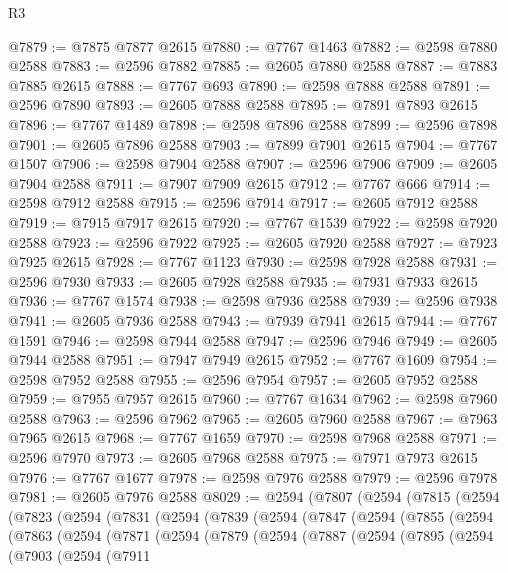 \begin{lexlean}{R3}
\begin{coremodule}
@7879 := @7875 @7877 @2615
@7880 := @7767 @1463
@7882 := @2598 @7880 @2588
@7883 := @2596 @7882
@7885 := @2605 @7880 @2588
@7887 := @7883 @7885 @2615
@7888 := @7767 @693
@7890 := @2598 @7888 @2588
@7891 := @2596 @7890
@7893 := @2605 @7888 @2588
@7895 := @7891 @7893 @2615
@7896 := @7767 @1489
@7898 := @2598 @7896 @2588
@7899 := @2596 @7898
@7901 := @2605 @7896 @2588
@7903 := @7899 @7901 @2615
@7904 := @7767 @1507
@7906 := @2598 @7904 @2588
@7907 := @2596 @7906
@7909 := @2605 @7904 @2588
@7911 := @7907 @7909 @2615
@7912 := @7767 @666
@7914 := @2598 @7912 @2588
@7915 := @2596 @7914
@7917 := @2605 @7912 @2588
@7919 := @7915 @7917 @2615
@7920 := @7767 @1539
@7922 := @2598 @7920 @2588
@7923 := @2596 @7922
@7925 := @2605 @7920 @2588
@7927 := @7923 @7925 @2615
@7928 := @7767 @1123
@7930 := @2598 @7928 @2588
@7931 := @2596 @7930
@7933 := @2605 @7928 @2588
@7935 := @7931 @7933 @2615
@7936 := @7767 @1574
@7938 := @2598 @7936 @2588
@7939 := @2596 @7938
@7941 := @2605 @7936 @2588
@7943 := @7939 @7941 @2615
@7944 := @7767 @1591
@7946 := @2598 @7944 @2588
@7947 := @2596 @7946
@7949 := @2605 @7944 @2588
@7951 := @7947 @7949 @2615
@7952 := @7767 @1609
@7954 := @2598 @7952 @2588
@7955 := @2596 @7954
@7957 := @2605 @7952 @2588
@7959 := @7955 @7957 @2615
@7960 := @7767 @1634
@7962 := @2598 @7960 @2588
@7963 := @2596 @7962
@7965 := @2605 @7960 @2588
@7967 := @7963 @7965 @2615
@7968 := @7767 @1659
@7970 := @2598 @7968 @2588
@7971 := @2596 @7970
@7973 := @2605 @7968 @2588
@7975 := @7971 @7973 @2615
@7976 := @7767 @1677
@7978 := @2598 @7976 @2588
@7979 := @2596 @7978
@7981 := @2605 @7976 @2588
@8029 := @2594
    (@7807
      (@2594
        (@7815
          (@2594
            (@7823
              (@2594
                (@7831
                  (@2594
                    (@7839
                      (@2594
                        (@7847
                          (@2594
                            (@7855
                              (@2594
                                (@7863
                                  (@2594
                                    (@7871
                                      (@2594
                                        (@7879
                                          (@2594
                                            (@7887
                                              (@2594
                                                (@7895
                                                  (@2594
                                                    (@7903
                                                      (@2594
                                                        (@7911

\end{coremodule}
\end{lexlean}
